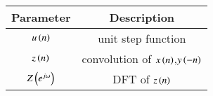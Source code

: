 \renewcommand{\arraystretch}{1.5}
\begin{tabular}{|c|c|}
\hline
Parameter & Description  \\\hline
$u\left(n\right)$& unit step function \\\hline
$z\left(n\right)$ & convolution of $x\left(n\right)$,$y\left(-n\right)$ \\\hline
$Z\left(e^{j\omega}\right)$ & DFT of $z\left(n\right)$ \\\hline
\end{tabular}
